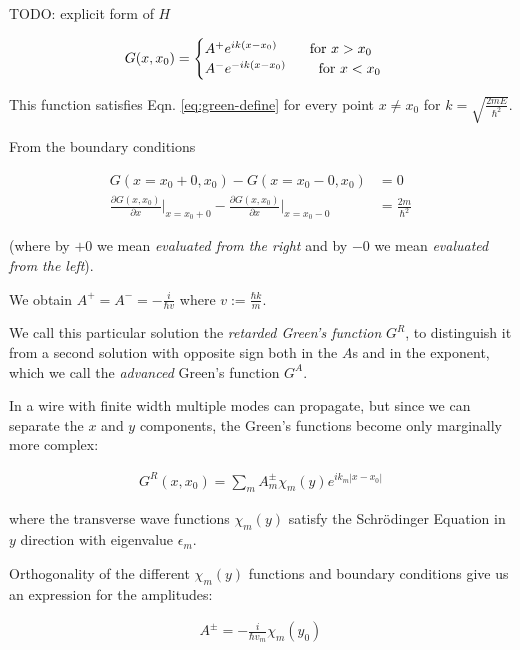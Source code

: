 \documentclass[11pt]{report}
\begin{document}
TODO: explicit form of $H$

\begin{align}
    G(x, x_0) = \begin{cases}
        A^+ e^{i k(x-x_0) } \qquad \textnormal{ for } x > x_0 \\
        A^- e^{-i k(x-x_0) } \qquad \textnormal{ for } x < x_0 \\
    \end{cases}
\end{align}

This function satisfies Eqn. \ref{eq:green-define} for every point $x \not=
x_0$  for $ k = \sqrt{\frac{2mE}{\hbar^2}}$.

From the boundary conditions

\begin{align}
    G(x = x_0 + 0, x_0) - G(x = x_0 - 0, x_0) &= 0 \\
    \frac{\partial G(x, x_0)}{\partial x}\left.\right|_{x=x_0 +0}
    -\frac{\partial G(x, x_0)}{\partial x}\left.\right|_{x=x_0 -0}
        &= \frac{2m}{\hbar^2}
\end{align}

(where by $+0$ we mean \emph{evaluated from the right} and by $-0$ we mean
\emph{evaluated from the left}).

We obtain $A^+ = A^- = -\frac{i}{\hbar v}$ where $v := \frac{\hbar k}{m} $.

We call this particular solution the \emph{retarded Green's function} $G^R$,
to distinguish it from a second solution with opposite sign both in the $A$s
and in the exponent, which we call the \emph{advanced} Green's function $G^A$.

In a wire with finite width multiple modes can propagate, but since we can
separate the $x$ and $y$ components, the Green's functions become only
marginally more complex:

\begin{align}
    G^R(x, x_0) = \sum_m A^\pm_m \chi_m(y) e^{i k_m |x - x_0|}
\end{align}

where the transverse wave functions $\chi_m(y)$ satisfy the Schrödinger
Equation in $y$ direction with eigenvalue $\epsilon_m$.

Orthogonality of the different $\chi_m(y)$ functions and boundary conditions
give us an expression for the amplitudes:

\begin{align}
    A^\pm = - \frac{i}{\hbar v_m} \chi_m(y_0)
\end{align}
\end{document}
